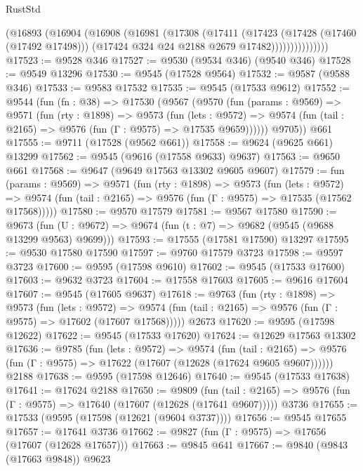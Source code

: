\begin{lexlean}{RustStd}
\begin{coremodule}
                  (@16893
                    (@16904
                      (@16908
                        (@16981
                          (@17308
                            (@17411
                              (@17423
                                (@17428 (@17460 (@17492 @17498)))
                                (@17424 @324 @24 @2188 @2679 @17482)))))))))))))))
@17523 := @9528 @346
@17527 := @9530 (@9534 @346) (@9540 @346)
@17528 := @9549 @13296
@17530 := @9545 (@17528 @9564)
@17532 := @9587 (@9588 @346)
@17533 := @9583 @17532
@17535 := @9545 (@17533 @9612)
@17552 := @9544
    (fun (fn : @38) =>
    @17530
      (@9567
        (@9570
          (fun (params : @9569) =>
          @9571
            (fun (rty : @1898) =>
            @9573
              (fun (lets : @9572) =>
              @9574 (fun (tail : @2165) => @9576 (fun (Γ : @9575) => @17535 @9659))))))
        @9705))
    @661
@17555 := @9711 (@17528 (@9562 @661))
@17558 := @9624 (@9625 @661) @13299
@17562 := @9545 (@9616 (@17558 @9633) @9637)
@17563 := @9650 @661
@17568 := @9647 (@9649 @17563 @13302 @9605 @9607)
@17579 := fun (params : @9569) =>
  @9571
    (fun (rty : @1898) =>
    @9573
      (fun (lets : @9572) =>
      @9574 (fun (tail : @2165) => @9576 (fun (Γ : @9575) => @17535 (@17562 @17568)))))
@17580 := @9570 @17579
@17581 := @9567 @17580
@17590 := @9673
    (fun (U : @9672) => @9674 (fun (t : @7) => @9682 (@9545 (@9688 @13299 @9563) @9699)))
@17593 := @17555 (@17581 @17590) @13297
@17595 := @9530 @17580 @17590
@17597 := @9760 @17579 @3723
@17598 := @9597 @3723
@17600 := @9595 (@17598 @9610)
@17602 := @9545 (@17533 @17600)
@17603 := @9632 @3723
@17604 := @17558 @17603
@17605 := @9616 @17604
@17607 := @9545 (@17605 @9637)
@17618 := @9763
    (fun (rty : @1898) =>
    @9573
      (fun (lets : @9572) =>
      @9574 (fun (tail : @2165) => @9576 (fun (Γ : @9575) => @17602 (@17607 @17568)))))
    @2673
@17620 := @9595 (@17598 @12622)
@17622 := @9545 (@17533 @17620)
@17624 := @12629 @17563 @13302
@17636 := @9785
    (fun (lets : @9572) =>
    @9574
      (fun (tail : @2165) =>
      @9576 (fun (Γ : @9575) => @17622 (@17607 (@12628 (@17624 @9605 @9607))))))
    @2188
@17638 := @9595 (@17598 @12646)
@17640 := @9545 (@17533 @17638)
@17641 := @17624 @2188
@17650 := @9809
    (fun (tail : @2165) => @9576 (fun (Γ : @9575) => @17640 (@17607 (@12628 (@17641 @9607)))))
    @3736
@17655 := @17533 (@9595 (@17598 (@12621 (@9604 @3737))))
@17656 := @9545 @17655
@17657 := @17641 @3736
@17662 := @9827 (fun (Γ : @9575) => @17656 (@17607 (@12628 @17657)))
@17663 := @9845 @641
@17667 := @9840 (@9843 (@17663 @9848)) @9623

\end{coremodule}
\end{lexlean}
